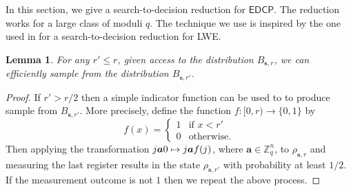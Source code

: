 \documentclass[11pt]{article}
\theoremstyle{plain}
\newtheorem{lemma}[theorem]{Lemma}
\theoremstyle{definition}
\let\ket\relax
\DeclarePairedDelimiter{\ket}{\lvert}{\rangle}
\def\Z{\mathbb{Z}}
\def\edcp{\mathsf{EDCP}}
\begin{document}
In this section, we give a search-to-decision reduction for $\edcp$. The reduction works for a large class of moduli $q$. The technique we use is inspired by the one used in \cite{micciancio2012trapdoors} for a search-to-decision reduction for LWE.
\begin{lemma}
    \label{lem:small-r}
    For any $r' \le r$, given access to the distribution $B_{\bm{s}, r}$, we can efficiently sample from the distribution $B_{\bm{s}, r'}$. 
\end{lemma}
\begin{proof}
    If $r' > r / 2$ then a simple indicator function can be used to to produce sample from $B_{\bm{s}, r'}$. More precisely, define the function $f: [0, r) \rightarrow \{ 0, 1 \}$ by
    \[ f(x) = 
    \begin{cases}
        1 & \text{if } x < r' \\
        0 & \text{otherwise}.
    \end{cases} \]
    Then applying the transformation $\ket{j}\ket{\bm{a}}\ket{0} \mapsto \ket{j}\ket{\bm{a}}\ket{f(j)}$, where $\bm{a} \in \Z_q^n$, to $\rho_{\bm{s}, r}$ and measuring the last register results in the state $\rho_{\bm{s}, r'}$ with probability at least $1 / 2$. If the measurement outcome is not $1$ then we repeat the above process.


\end{proof}
\end{document}
